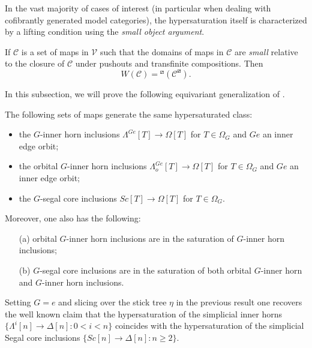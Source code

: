 \documentclass[a4paper,10pt,draft]{article}%
\begin{document}
In the vast majority of cases of interest
(in particular when dealing with cofibrantly generated model categories),
the hypersaturation itself is characterized by a lifting condition using the \textit{small object argument}.

\begin{lemma}
      If $\mathcal C$ is a set of maps in $\mathcal V$ such that
      the domains of maps in $\mathcal C$ are \textit{small} relative to
      the closure of $\mathcal C$ under pushouts and transfinite compositions.
      Then
      \begin{equation}
            W(\mathcal C) = {}^\boxslash(\mathcal C^{\boxslash}).
      \end{equation}
\end{lemma}


In this subsection, we will prove the following equivariant generalization of \cite[Props. 2.4 and 2.5]{CM13a}.

\begin{proposition}
The following sets of maps generate the same hypersaturated class:
\begin{itemize}
\item the $G$-inner horn inclusions
$\Lambda^{Ge} [T] \to \Omega[T]$ for $T \in \Omega_G$ and $Ge$ an inner edge orbit; 
\item the orbital $G$-inner horn inclusions
$\Lambda^{Ge}_o [T] \to \Omega[T]$ for $T \in \Omega_G$ and $Ge$ an inner edge orbit; 
\item the $G$-segal core inclusions
$Sc [T] \to \Omega[T]$ for $T \in \Omega_G$.
\end{itemize}
Moreover, one also has the following:
\begin{itemize}
	\item[(a)] orbital $G$-inner horn inclusions are in the saturation of $G$-inner horn inclusions;
	\item[(b)] $G$-segal core inclusions are in the saturation of both orbital $G$-inner horn and $G$-inner horn inclusions.
\end{itemize}
\end{proposition}


\begin{remark}
	Setting $G=e$ and slicing over the stick tree $\eta$ in the previous result
	one recovers the well known claim that 
	the hypersaturation of the simplicial inner horns
	$\{\Lambda^i[n] \to \Delta[n] \colon 0< i < n\}$
	coincides with the hypersaturation of the simplicial Segal core inclusions
	$\{Sc[n] \to \Delta[n]\colon n \geq 2\}$.
\end{remark}
\end{document}
